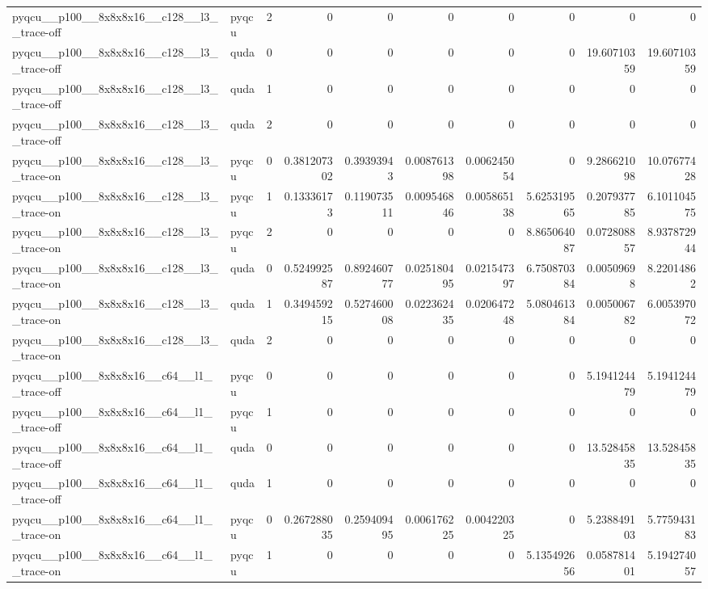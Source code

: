 \begin{table}[htbp]
\begin{tabular}{@{}llrrrrrrrr@{}}
pyqcu\_\_p100\_\_8x8x8x16\_\_c128\_\_l3\_\_trace-off & pyqcu & 2 & 0 & 0 & 0 & 0 & 0 & 0 & 0 \\
pyqcu\_\_p100\_\_8x8x8x16\_\_c128\_\_l3\_\_trace-off & quda & 0 & 0 & 0 & 0 & 0 & 0 & 19.60710359 & 19.60710359 \\
pyqcu\_\_p100\_\_8x8x8x16\_\_c128\_\_l3\_\_trace-off & quda & 1 & 0 & 0 & 0 & 0 & 0 & 0 & 0 \\
pyqcu\_\_p100\_\_8x8x8x16\_\_c128\_\_l3\_\_trace-off & quda & 2 & 0 & 0 & 0 & 0 & 0 & 0 & 0 \\
pyqcu\_\_p100\_\_8x8x8x16\_\_c128\_\_l3\_\_trace-on & pyqcu & 0 & 0.381207302 & 0.39393943 & 0.008761398 & 0.006245054 & 0 & 9.286621098 & 10.07677428 \\
pyqcu\_\_p100\_\_8x8x8x16\_\_c128\_\_l3\_\_trace-on & pyqcu & 1 & 0.13336173 & 0.119073511 & 0.009546846 & 0.005865138 & 5.625319565 & 0.207937785 & 6.101104575 \\
pyqcu\_\_p100\_\_8x8x8x16\_\_c128\_\_l3\_\_trace-on & pyqcu & 2 & 0 & 0 & 0 & 0 & 8.865064087 & 0.072808857 & 8.937872944 \\
pyqcu\_\_p100\_\_8x8x8x16\_\_c128\_\_l3\_\_trace-on & quda & 0 & 0.524992587 & 0.892460777 & 0.025180495 & 0.021547397 & 6.750870384 & 0.00509698 & 8.22014862 \\
pyqcu\_\_p100\_\_8x8x8x16\_\_c128\_\_l3\_\_trace-on & quda & 1 & 0.349459215 & 0.527460008 & 0.022362435 & 0.020647248 & 5.080461384 & 0.005006782 & 6.005397072 \\
pyqcu\_\_p100\_\_8x8x8x16\_\_c128\_\_l3\_\_trace-on & quda & 2 & 0 & 0 & 0 & 0 & 0 & 0 & 0 \\
pyqcu\_\_p100\_\_8x8x8x16\_\_c64\_\_l1\_\_trace-off & pyqcu & 0 & 0 & 0 & 0 & 0 & 0 & 5.194124479 & 5.194124479 \\
pyqcu\_\_p100\_\_8x8x8x16\_\_c64\_\_l1\_\_trace-off & pyqcu & 1 & 0 & 0 & 0 & 0 & 0 & 0 & 0 \\
pyqcu\_\_p100\_\_8x8x8x16\_\_c64\_\_l1\_\_trace-off & quda & 0 & 0 & 0 & 0 & 0 & 0 & 13.52845835 & 13.52845835 \\
pyqcu\_\_p100\_\_8x8x8x16\_\_c64\_\_l1\_\_trace-off & quda & 1 & 0 & 0 & 0 & 0 & 0 & 0 & 0 \\
pyqcu\_\_p100\_\_8x8x8x16\_\_c64\_\_l1\_\_trace-on & pyqcu & 0 & 0.267288035 & 0.259409495 & 0.006176225 & 0.004220325 & 0 & 5.238849103 & 5.775943183 \\
pyqcu\_\_p100\_\_8x8x8x16\_\_c64\_\_l1\_\_trace-on & pyqcu & 1 & 0 & 0 & 0 & 0 & 5.135492656 & 0.058781401 & 5.194274057 \\

\end{tabular}
\end{table}

